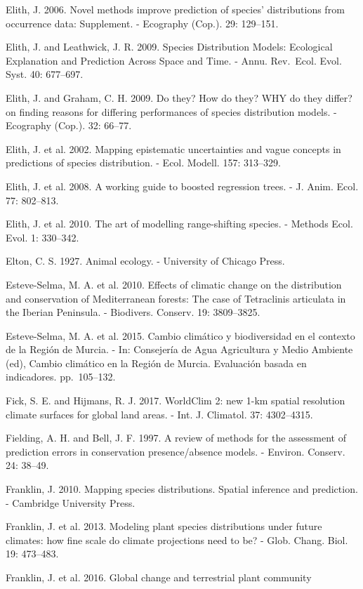 \documentclass[11pt,twoside]{reedthesis}
\begin{document}
Elith, J. 2006. Novel methods improve prediction of species'
distributions from occurrence data: Supplement. - Ecography (Cop.). 29:
129--151.\par
Elith, J. and Leathwick, J. R. 2009. Species Distribution Models:
Ecological Explanation and Prediction Across Space and Time. - Annu.
Rev.~Ecol. Evol. Syst. 40: 677--697.\par
Elith, J. and Graham, C. H. 2009. Do they? How do they? WHY do they
differ? on finding reasons for differing performances of species
distribution models. - Ecography (Cop.). 32: 66--77.\par
Elith, J. et al. 2002. Mapping epistematic uncertainties and vague
concepts in predictions of species distribution. - Ecol. Modell. 157:
313--329.\par
Elith, J. et al. 2008. A working guide to boosted regression trees. - J.
Anim. Ecol. 77: 802--813.\par
Elith, J. et al. 2010. The art of modelling range-shifting species. -
Methods Ecol. Evol. 1: 330--342.\par
Elton, C. S. 1927. Animal ecology. - University of Chicago Press.\par
Esteve-Selma, M. A. et al. 2010. Effects of climatic change on the
distribution and conservation of Mediterranean forests: The case of
Tetraclinis articulata in the Iberian Peninsula. - Biodivers. Conserv.
19: 3809--3825.\par
Esteve-Selma, M. A. et al. 2015. Cambio climático y biodiversidad en el
contexto de la Región de Murcia. - In: Consejería de Agua Agricultura y
Medio Ambiente (ed), Cambio climático en la Región de Murcia. Evaluación
basada en indicadores. pp.~105--132.\par
Fick, S. E. and Hijmans, R. J. 2017. WorldClim 2: new 1-km spatial
resolution climate surfaces for global land areas. - Int. J. Climatol.
37: 4302--4315.\par
Fielding, A. H. and Bell, J. F. 1997. A review of methods for the
assessment of prediction errors in conservation presence/absence models.
- Environ. Conserv. 24: 38--49.\par
Franklin, J. 2010. Mapping species distributions. Spatial inference and
prediction. - Cambridge University Press.\par
Franklin, J. et al. 2013. Modeling plant species distributions under
future climates: how fine scale do climate projections need to be? -
Glob. Chang. Biol. 19: 473--483.\par
Franklin, J. et al. 2016. Global change and terrestrial plant community
\end{document}
